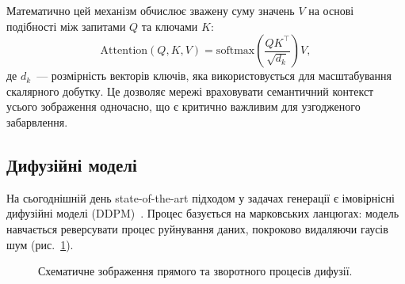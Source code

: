 \documentclass[]{iptconf}
\begin{document}
            Математично цей механізм обчислює зважену суму значень $V$ на основі подібності між запитами $Q$ та ключами $K$:
            \begin{equation*}
                \mathrm{Attention}(Q, K, V) = \mathrm{softmax}\left(\frac{Q K^\top}{\sqrt{d_k}}\right)V,
            \end{equation*}
            де $d_k$~--- розмірність векторів ключів, яка використовується для масштабування скалярного добутку. Це дозволяє мережі враховувати семантичний контекст усього зображення одночасно, що є критично важливим для узгодженого забарвлення.
		
		\subsection{Дифузійні моделі}
			На сьогоднішній день state-of-the-art підходом у задачах генерації є імовірнісні дифузійні моделі (DDPM)~\cite{2023-diffusion-models-survey}. Процес базується на марковських ланцюгах: модель навчається реверсувати процес руйнування даних, покроково видаляючи гаусів шум (рис.~\ref{fig:diffusion}).

			\begin{figure}[h]
				\centering
				\caption{Схематичне зображення прямого та зворотного процесів дифузії.}
				\label{fig:diffusion}
			\end{figure}
\end{document}

